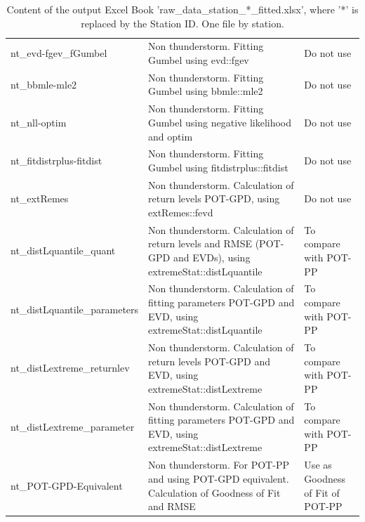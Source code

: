 \documentclass[12pt,oneside]{reedthesis}
\begin{document}
\begingroup\fontsize{8}{10}\selectfont
\begin{longtable}[t]{>{\raggedright\arraybackslash}p{1.5in}>{\raggedright\arraybackslash}p{3in}>{\raggedright\arraybackslash}p{1.5in}}
\caption[Content of raw\_data\_station\_*\_fitted.xlsx]{\label{tab:rawdatastationidfitted}Content of the output Excel Book 'raw\_data\_station\_*\_fitted.xlsx', where '*' is replaced by the Station ID. One file by station.}\\
\toprule
\multicolumn{1}{l}{Excel Sheet Name} & \multicolumn{1}{l}{Description} & \multicolumn{1}{l}{Important}\\
\midrule
nt\_evd-fgev\_fGumbel & Non thunderstorm. Fitting Gumbel using evd::fgev & Do not use\\
nt\_bbmle-mle2 & Non thunderstorm. Fitting Gumbel using bbmle::mle2 & Do not use\\
nt\_nll-optim & Non thunderstorm. Fitting Gumbel using negative likelihood and optim & Do not use\\
nt\_fitdistrplus-fitdist & Non thunderstorm. Fitting Gumbel using fitdistrplus::fitdist & Do not use\\
nt\_extRemes & Non thunderstorm. Calculation of return levels POT-GPD, using extRemes::fevd & Do not use\\
nt\_distLquantile\_quant & Non thunderstorm. Calculation of return levels and RMSE (POT-GPD and EVDs), using extremeStat::distLquantile & To compare with POT-PP\\
nt\_distLquantile\_parameters & Non thunderstorm. Calculation of fitting parameters POT-GPD and EVD, using extremeStat::distLquantile & To compare with POT-PP\\
nt\_distLextreme\_returnlev & Non thunderstorm. Calculation of return levels POT-GPD and EVD, using extremeStat::distLextreme & To compare with POT-PP\\
nt\_distLextreme\_parameter & Non thunderstorm. Calculation of fitting parameters POT-GPD and EVD, using extremeStat::distLextreme & To compare with POT-PP\\
nt\_POT-GPD-Equivalent & Non thunderstorm. For POT-PP and using POT-GPD equivalent. Calculation of Goodness of Fit and RMSE & Use as Goodness of Fit of POT-PP\\
\bottomrule
\end{longtable}
\endgroup{}
\end{document}
